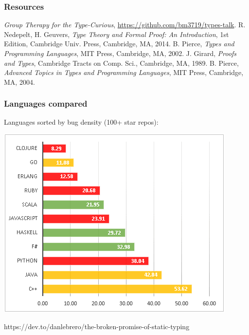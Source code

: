\documentclass{beamer}
\begin{document}
\begin{frame}
  \frametitle{Resources}
  \begin{thebibliography}{9}
   \emph{Group Therapy for the Type-Curious},
    \url{https://github.com/bm3719/types-talk}.
   R. Nedepelt, H. Geuvers, \emph{Type Theory and Formal Proof: An
      Introduction}, 1st Edition, Cambridge Univ. Press, Cambridge, MA, 2014.
   B. Pierce, \emph{Types and Programming Languages}, MIT
    Press, Cambridge, MA, 2002.
   J. Girard, \emph{Proofs and Types}, Cambridge Tracts on
    Comp. Sci., Cambridge, MA, 1989.
   B. Pierce, \emph{Advanced Topics in Types and Programming
      Languages}, MIT Press, Cambridge, MA, 2004.
  \end{thebibliography}
\end{frame}

\begin{frame}
  \frametitle{Languages compared}
  Languages sorted by bug density (100+ star repos):\\
  \vspace{10pt}
  \centerline{\includegraphics[scale=0.4]{img/bug_density.png}}
  \footnotesize{
  \begin{flushright}
    https://dev.to/danlebrero/the-broken-promise-of-static-typing
  \end{flushright}
  }
\end{frame}
\end{document}
